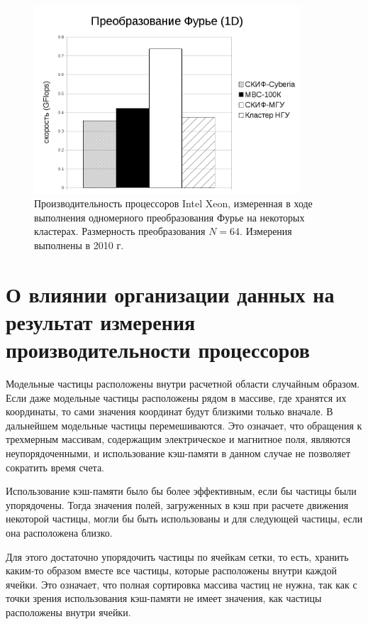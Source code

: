 \begin{figure}[htb]
	\begin{center}
		\includegraphics[height=7cm,keepaspectratio]{images/processor_FLOPS.png}
	\end{center}
	\caption{Производительность процессоров Intel Xeon, измеренная в ходе выполнения одномерного преобразования Фурье на некоторых кластерах. Размерность преобразования $N=64$. Измерения выполнены в 2010 г.}
	\label{procs_flops}
\end{figure} 

\section{О влиянии организации данных на результат измерения производительности процессоров}
\label{procs_influence}

Модельные частицы расположены внутри расчетной области случайным образом. Если даже модельные частицы расположены рядом в массиве, где хранятся их координаты,  то сами значения координат будут близкими только вначале. В дальнейшем модельные частицы перемешиваются. Это означает, что обращения к трехмерным массивам, содержащим электрическое и магнитное поля, являются неупорядоченными,  и использование кэш-памяти в данном случае не позволяет сократить время счета. 

Использование кэш-памяти было бы более эффективным, если бы частицы были упорядочены. Тогда значения полей, загруженных в кэш при расчете движения некоторой частицы, могли бы быть использованы и для следующей частицы, если она расположена близко. 

Для этого достаточно упорядочить частицы по ячейкам сетки, то есть, хранить каким-то образом вместе все частицы, которые расположены внутри каждой ячейки. Это означает, что полная сортировка массива частиц не нужна, так как с точки зрения использования кэш-памяти не имеет значения, как частицы расположены внутри ячейки. 

